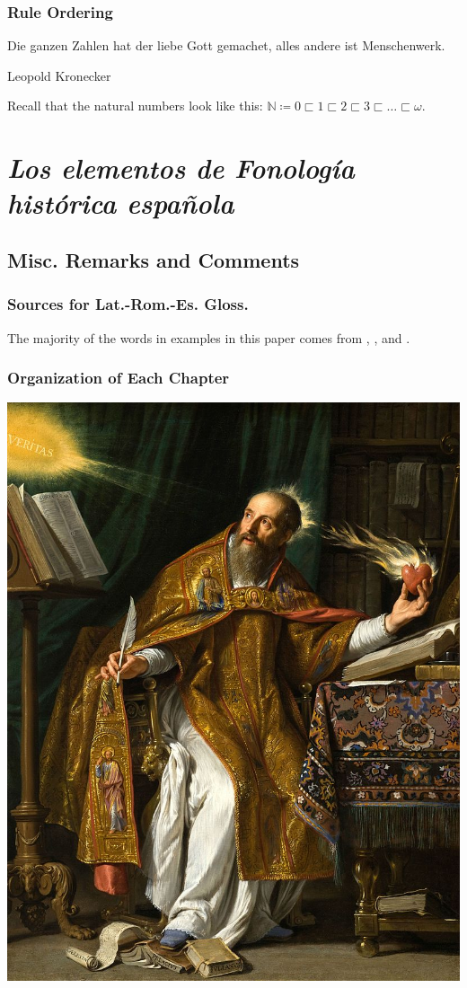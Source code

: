 \documentclass{report}[12pt]
\begin{document}
\section{Rule Ordering}

\epigraph{Die ganzen Zahlen hat der liebe Gott gemachet, alles andere ist Menschenwerk.}{Leopold Kronecker}

Recall that the natural numbers look like this: $\mathbb{N} \coloneq 0 \sqsubset 1 \sqsubset 2 \sqsubset 3 \sqsubset \dots \sqsubset \omega$.

\part{\emph{Los elementos de Fonología histórica española}}

\chapter{Misc. Remarks and Comments}

\section{Sources for Lat.-Rom.-Es. Gloss.}

The majority of the words in examples in this paper comes from \cite{romance_his}, \cite{lloyd_spanish}, and \cite{penny_spanish}. 

\section{Organization of Each Chapter}

\pagebreak

\includegraphics[scale=0.5]{augustine.jpg}
\thispagestyle{empty}
\end{document}
